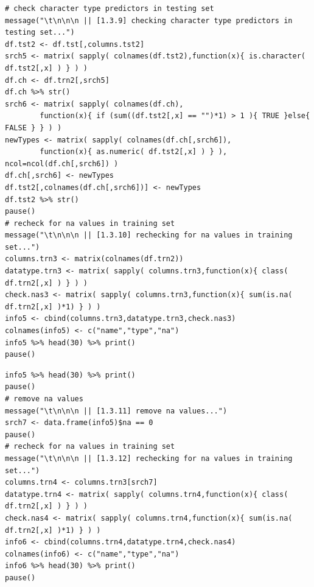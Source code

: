 \documentclass[10pt, twoside]{article}
\begin{document}
\begin{verbatim}
# check character type predictors in testing set
message("\t\n\n\n || [1.3.9] checking character type predictors in testing set...")
df.tst2 <- df.tst[,columns.tst2]
srch5 <- matrix( sapply( colnames(df.tst2),function(x){ is.character( df.tst2[,x] ) } ) )
df.ch <- df.trn2[,srch5]
df.ch %>% str()
srch6 <- matrix( sapply( colnames(df.ch),
        function(x){ if (sum((df.tst2[,x] == "")*1) > 1 ){ TRUE }else{ FALSE } } ) )
newTypes <- matrix( sapply( colnames(df.ch[,srch6]),
        function(x){ as.numeric( df.tst2[,x] ) } ), ncol=ncol(df.ch[,srch6]) )
df.ch[,srch6] <- newTypes
df.tst2[,colnames(df.ch[,srch6])] <- newTypes
df.tst2 %>% str()
pause()
# recheck for na values in training set
message("\t\n\n\n || [1.3.10] rechecking for na values in training set...")
columns.trn3 <- matrix(colnames(df.trn2))
datatype.trn3 <- matrix( sapply( columns.trn3,function(x){ class( df.trn2[,x] ) } ) )
check.nas3 <- matrix( sapply( columns.trn3,function(x){ sum(is.na( df.trn2[,x] )*1) } ) )
info5 <- cbind(columns.trn3,datatype.trn3,check.nas3)
colnames(info5) <- c("name","type","na")
info5 %>% head(30) %>% print()
pause()
\end{verbatim}

\begin{verbatim}
info5 %>% head(30) %>% print()
pause()
# remove na values
message("\t\n\n\n || [1.3.11] remove na values...")
srch7 <- data.frame(info5)$na == 0
pause()
# recheck for na values in training set
message("\t\n\n\n || [1.3.12] rechecking for na values in training set...")
columns.trn4 <- columns.trn3[srch7]
datatype.trn4 <- matrix( sapply( columns.trn4,function(x){ class( df.trn2[,x] ) } ) )
check.nas4 <- matrix( sapply( columns.trn4,function(x){ sum(is.na( df.trn2[,x] )*1) } ) )
info6 <- cbind(columns.trn4,datatype.trn4,check.nas4)
colnames(info6) <- c("name","type","na")
info6 %>% head(30) %>% print()
pause()
\end{verbatim}
\end{document}
